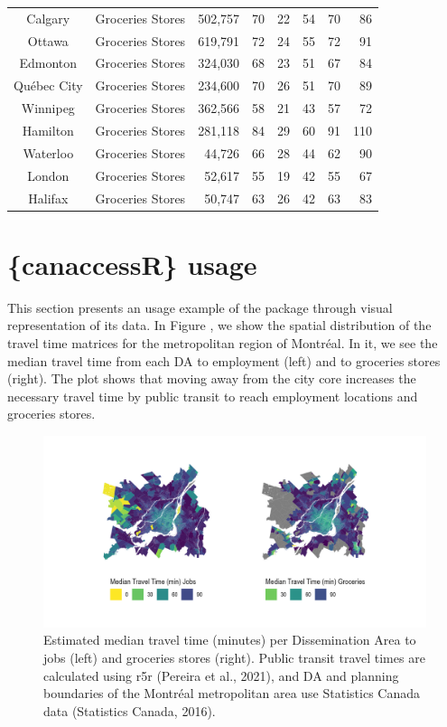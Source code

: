 \documentclass[Royal,times,sageh]{sagej}
\begin{document}
\begin{longtable}{@{\extracolsep{\fill}}clrrrrrr}
Calgary & Groceries Stores & 502,757 & 70 & 22 & 54 & 70 & 86 \\ 
Ottawa & Groceries Stores & 619,791 & 72 & 24 & 55 & 72 & 91 \\ 
Edmonton & Groceries Stores & 324,030 & 68 & 23 & 51 & 67 & 84 \\ 
Québec City & Groceries Stores & 234,600 & 70 & 26 & 51 & 70 & 89 \\ 
Winnipeg & Groceries Stores & 362,566 & 58 & 21 & 43 & 57 & 72 \\ 
Hamilton & Groceries Stores & 281,118 & 84 & 29 & 60 & 91 & 110 \\ 
Waterloo & Groceries Stores & 44,726 & 66 & 28 & 44 & 62 & 90 \\ 
London & Groceries Stores & 52,617 & 55 & 19 & 42 & 55 & 67 \\ 
Halifax & Groceries Stores & 50,747 & 63 & 26 & 42 & 63 & 83 \\ 
\bottomrule
\end{longtable}
\endgroup

\section{\{canaccessR\} usage}\label{canaccessr-usage}

This section presents an usage example of the package through visual
representation of its data. In Figure
\citet{fig-travel_time_emp_grc_plot}, we show the spatial distribution
of the travel time matrices for the metropolitan region of Montréal. In
it, we see the median travel time from each DA to employment (left) and
to groceries stores (right). The plot shows that moving away from the
city core increases the necessary travel time by public transit to reach
employment locations and groceries stores.

\begin{figure}[H]
\includegraphics[width=1\linewidth]{../figures/patch_tt_emp_grc} \caption{Estimated median travel time (minutes) per Dissemination Area to jobs (left) and groceries stores (right). Public transit travel times are calculated using {r5r} (Pereira et al., 2021), and DA and planning boundaries of the Montréal metropolitan area use Statistics Canada data (Statistics Canada, 2016).}\label{fig:fig-travel_time_emp_grc_plot}
\end{figure}
\end{document}
